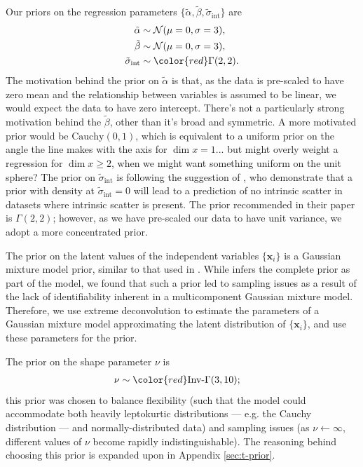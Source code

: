 \documentclass[fleqn,usenatbib]{mnras}
\newcommand{\indepvars}{\boldsymbol{x}_i}
\newcommand{\intercept}{\alpha}
\newcommand{\covariate}{\beta}
\begin{document}
Our priors on the regression parameters $\{\tilde{\intercept},
\tilde{\covariate}, \tilde{\sigma}_{\text{int}}\}$ are
\begin{align}
    \tilde{\intercept} \sim&\; \mathcal N(\mu = 0, \sigma = 3), \\
    \tilde{\covariate} \sim&\; \mathcal N(\mu = 0, \sigma = 3), \\
    \tilde{\sigma}_{\text{int}} \sim&\; {\color{red}\Gamma(2, 2)}. \\
\end{align}
The motivation behind the prior on $\tilde{\intercept}$ is that, as the data is
pre-scaled to have zero mean and the relationship between variables is assumed
to be linear, we would expect the data to have zero intercept.  {\color{red}
There's not a particularly strong motivation behind the $\tilde{\covariate}$,
other than it's broad and symmetric. A more motivated prior would be
$\text{Cauchy}(0, 1)$, which is equivalent to a uniform prior on the angle the
line makes with the axis for $\dim x = 1$... but might overly weight a
regression for $\dim x \geq 2$, when we might want something uniform on the unit
sphere?} The prior on $\tilde{\sigma}_{\text{int}}$ is following the suggestion
of \citet{Chung:2015}, who demonstrate that a prior with density at
$\tilde{\sigma}_{\text{int}} = 0$ will lead to a prediction of no intrinsic
scatter in datasets where intrinsic scatter is present. The prior recommended in
their paper is {\color{red} $\Gamma(2, 2)$}; however, as we have pre-scaled our
data to have unit variance, we adopt a more concentrated prior.

The prior on the latent values of the independent variables $\{\indepvars\}$ is
a Gaussian mixture model prior, similar to that used in \citet{Kelly:2007}.
While \citeauthor{Kelly:2007} infers the complete prior as part of the model, we
found that such a prior led to sampling issues as a result of the lack of
identifiability inherent in a multicomponent Gaussian mixture model. Therefore,
we use extreme deconvolution \citep{Bovy:2011} to estimate the parameters of a
Gaussian mixture model approximating the latent distribution of
$\{\indepvars\}$, and use these parameters for the prior.

The prior on the shape parameter $\nu$ is
\begin{align}
    \nu \sim&\; {\color{red}\text{Inv-}\Gamma(3, 10)};
\end{align}
this prior was chosen to balance flexibility (such that the model could
accommodate both heavily leptokurtic distributions --- e.g. the Cauchy
distribution --- and normally-distributed data) and sampling issues (as $\nu
\leftarrow \infty$, different values of $\nu$ become rapidly indistinguishable).
The reasoning behind choosing this prior is expanded upon in Appendix
\ref{sec:t-prior}.
\end{document}
